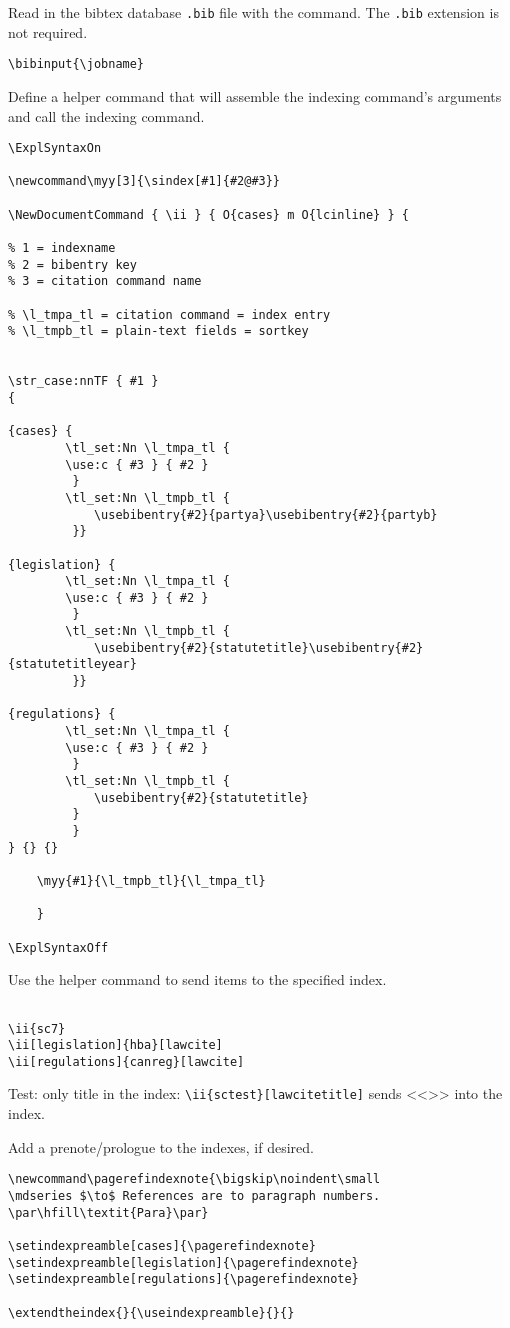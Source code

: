 \yin Read in the bibtex database \verb,.bib, file with the  command. The \verb,.bib, extension is not required.
\yq
\begin{verbatim}
\bibinput{\jobname}
\end{verbatim}
\yqq


\yin Define a helper command that will assemble the indexing command's arguments and call the indexing command.
\yq
\begin{verbatim}
\ExplSyntaxOn

\newcommand\myy[3]{\sindex[#1]{#2@#3}}

\NewDocumentCommand { \ii } { O{cases} m O{lcinline} } {

% 1 = indexname
% 2 = bibentry key 
% 3 = citation command name

% \l_tmpa_tl = citation command = index entry
% \l_tmpb_tl = plain-text fields = sortkey


\str_case:nnTF { #1 }
{

{cases} { 
		\tl_set:Nn \l_tmpa_tl {
		\use:c { #3 } { #2 }
		 }
		\tl_set:Nn \l_tmpb_tl {
			\usebibentry{#2}{partya}\usebibentry{#2}{partyb}
		 }}

{legislation} { 
		\tl_set:Nn \l_tmpa_tl {
		\use:c { #3 } { #2 }
		 }
		\tl_set:Nn \l_tmpb_tl {
			\usebibentry{#2}{statutetitle}\usebibentry{#2}{statutetitleyear}
		 }}

{regulations} { 
		\tl_set:Nn \l_tmpa_tl {
		\use:c { #3 } { #2 }
		 }
		\tl_set:Nn \l_tmpb_tl {
			\usebibentry{#2}{statutetitle}
		 }
		 }
} {} {}

	\myy{#1}{\l_tmpb_tl}{\l_tmpa_tl} 

	}

\ExplSyntaxOff
\end{verbatim}
\yqq


\yin Use the helper command to send items to the specified index.
\yq
\begin{verbatim}

\ii{sc7}
\ii[legislation]{hba}[lawcite]
\ii[regulations]{canreg}[lawcite]

\end{verbatim}

Test: only title in the index: 
\verb.\ii{sctest}[lawcitetitle]. sends <<>> into the index.

\yqq


\yin Add a prenote/prologue to the indexes, if desired.
\yq
\begin{verbatim}
\newcommand\pagerefindexnote{\bigskip\noindent\small
\mdseries $\to$ References are to paragraph numbers.
\par\hfill\textit{Para}\par}

\setindexpreamble[cases]{\pagerefindexnote}
\setindexpreamble[legislation]{\pagerefindexnote}
\setindexpreamble[regulations]{\pagerefindexnote}

\extendtheindex{}{\useindexpreamble}{}{}

\end{verbatim}
\yqq





